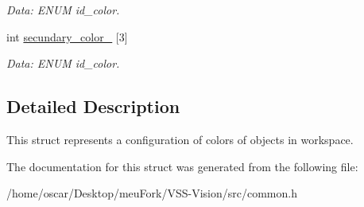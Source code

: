 \begin{DoxyCompactItemize}
\begin{DoxyCompactList}\small\item\em Data\-: E\-N\-U\-M id\-\_\-color. \end{DoxyCompactList}\item 
\hypertarget{structcommon_1_1ExecConfiguration_aea1aed941fceb299c6766e6330ec802e}{int \hyperlink{structcommon_1_1ExecConfiguration_aea1aed941fceb299c6766e6330ec802e}{secundary\-\_\-color\-\_} \mbox{[}3\mbox{]}}\label{structcommon_1_1ExecConfiguration_aea1aed941fceb299c6766e6330ec802e}

\begin{DoxyCompactList}\small\item\em Data\-: E\-N\-U\-M id\-\_\-color. \end{DoxyCompactList}\end{DoxyCompactItemize}


\subsection{Detailed Description}
This struct represents a configuration of colors of objects in workspace. 

The documentation for this struct was generated from the following file\-:\begin{DoxyCompactItemize}
\item 
/home/oscar/\-Desktop/meu\-Fork/\-V\-S\-S-\/\-Vision/src/common.\-h\end{DoxyCompactItemize}
